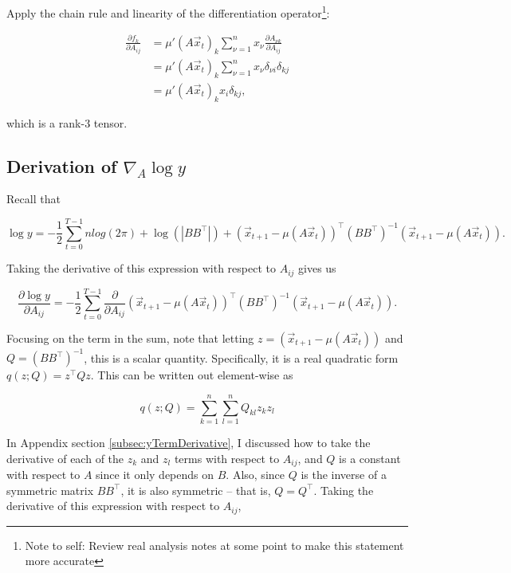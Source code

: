 \documentclass[12pt]{article}
\theoremstyle{definition}
\begin{document}
Apply the chain rule and linearity of the differentiation operator\footnote{Note to self: Review real analysis notes at some point to make this statement more accurate}:

\[
\begin{split}
    \frac{\partial f_k}{\partial A_{ij}} &= \mu'(A\Vec{x}_t)_k \sum_{\nu = 1}^{n}x_\nu \frac{\partial A_{\nu k}}{\partial A_{ij}} \\ 
    & = \mu'(A\Vec{x}_t)_k \sum_{\nu = 1}^{n}x_\nu \delta_{\nu i} \delta_{kj} \\ 
    & = \mu'(A\Vec{x}_t)_k x_i \delta_{kj},
\end{split}
\]

which is a rank-$3$ tensor. 

\subsection{Derivation of $\nabla_A \log y$}
\label{subsec:gradADerivation}

Recall that 

\[
\log y =  - \frac{1}{2} \sum_{t=0}^{T - 1} n log(2\pi) + \log(|BB^\top|) + (\Vec{x}_{t+1} - \mu(A\Vec{x}_t))^\top (BB^\top)^{-1} (\Vec{x}_{t+1} - \mu(A\Vec{x}_t)).
\] 

Taking the derivative of this expression with respect to $A_{ij}$ gives us

\begin{equation}
    \label{eqn:likelihoodDerivativeA}
    \frac{\partial \log y}{\partial A_{ij}} = - \frac{1}{2} \sum_{t=0}^{T - 1} \frac{\partial}{\partial A_{ij}} (\Vec{x}_{t+1} - \mu(A\Vec{x}_t))^\top (BB^\top)^{-1} (\Vec{x}_{t+1} - \mu(A\Vec{x}_t)).
\end{equation}


Focusing on the term in the sum, note that letting $z = (\Vec{x}_{t+1} - \mu(A\Vec{x}_t))$ and $Q = (BB^\top)^{-1}$, this is a scalar quantity. Specifically, it is a real quadratic form $q(z; Q) = z^\top Q z$. This can be written out element-wise as

\[
q(z; Q) = \sum_{k=1}^{n} \sum_{l=1}^{n} Q_{kl} z_k z_l
\]

In Appendix section \ref{subsec:yTermDerivative}, I discussed how to take the derivative of each of the $z_k$ and $z_l$ terms with respect to $A_{ij}$, and $Q$ is a constant with respect to $A$ since it only depends on $B$. Also, since $Q$ is the inverse of a symmetric matrix $BB^\top$, it is also symmetric -- that is, $Q=Q^\top$. Taking the derivative of this expression with respect to $A_{ij}$,
\end{document}
